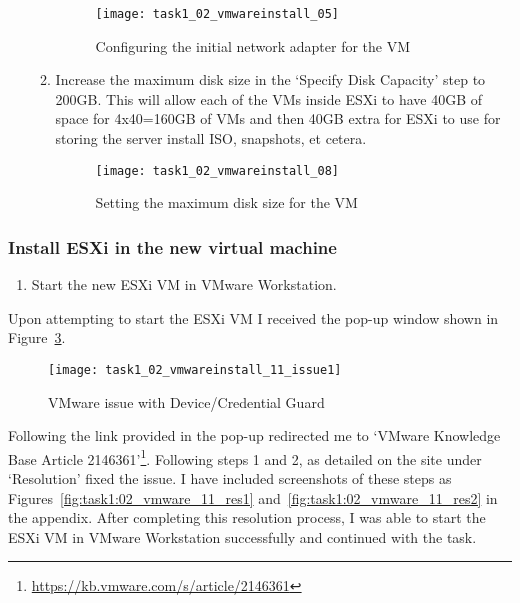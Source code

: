 \begin{enumerate}[resume*=task1methodology]
\begin{enumerate}[label=\alph*)]
        \begin{figure}[H]
          \centering
          \captionsetup{skip=2pt}
          \texttt{[image: task1\_02\_vmwareinstall\_05]}
          \caption{Configuring the initial network adapter for the VM}
          \label{fig:task1:02_vmwarewiz_05}
        \end{figure}
      \item Increase the maximum disk size in the `Specify Disk Capacity' step to 200GB. This will allow each of the VMs inside ESXi to have 40GB of space for 4x40=160GB of VMs and then 40GB extra for ESXi to use for storing the server install ISO, snapshots, et cetera.
        \begin{figure}[H]
          \centering
          \captionsetup{skip=2pt}
          \texttt{[image: task1\_02\_vmwareinstall\_08]}
          \caption{Setting the maximum disk size for the VM}
          \label{fig:task1:02_vmwarewiz_08}
        \end{figure}
    \end{enumerate}
\end{enumerate}

\subsubsection*{Install ESXi in the new virtual machine}
\begin{enumerate}[resume*=task1methodology]
  \item Start the new ESXi VM in VMware Workstation.
\end{enumerate}

\noindent Upon attempting to start the ESXi VM I received the pop-up window shown in Figure~\ref{fig:task1:02_vmwarewiz_11_issue}.

\begin{figure}[H]
  \centering
  \captionsetup{skip=2pt}
  \texttt{[image: task1\_02\_vmwareinstall\_11\_issue1]}
  \caption{VMware issue with Device/Credential Guard}
  \label{fig:task1:02_vmwarewiz_11_issue}
\end{figure}

Following the link provided in the pop-up redirected me to `VMware Knowledge Base Article 2146361'\footnote{\url{https://kb.vmware.com/s/article/2146361}}. Following steps 1 and 2, as detailed on the site under `Resolution' fixed the issue. I have included screenshots of these steps as Figures~\ref{fig:task1:02_vmware_11_res1} and~\ref{fig:task1:02_vmware_11_res2} in the  appendix. After completing this resolution process, I was able to start the ESXi VM in VMware Workstation successfully and continued with the task.

